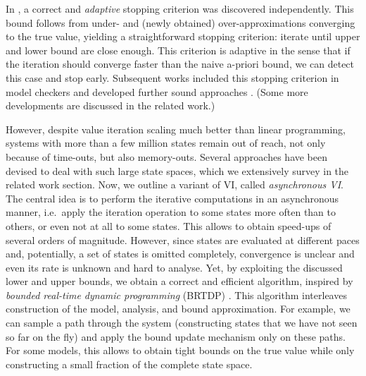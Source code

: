 \documentclass{article}
\begin{document}
In \cite{DBLP:conf/rp/HaddadM14,DBLP:conf/atva/BrazdilCCFKKPU14}, a correct and \emph{adaptive} stopping criterion was discovered independently.
This bound follows from under- and (newly obtained) over-approximations converging to the true value, yielding a straightforward stopping criterion: iterate until upper and lower bound are close enough.
This criterion is adaptive in the sense that if the iteration should converge faster than the naive a-priori bound, we can detect this case and stop early.
Subsequent works included this stopping criterion in model checkers \cite{DBLP:conf/cav/Baier0L0W17} and developed further sound approaches \cite{DBLP:conf/cav/QuatmannK18,DBLP:conf/cav/HartmannsK20}.
(Some more developments are discussed in the related work.)

However, despite value iteration scaling much better than linear programming, systems with more than a few million states remain out of reach, not only because of time-outs, but also memory-outs.
Several approaches have been devised to deal with such large state spaces, which we extensively survey in the related work section.
Now, we outline a variant of VI, called \emph{asynchronous VI}.
The central idea is to perform the iterative computations in an asynchronous manner, i.e.\ apply the iteration operation to some states more often than to others, or even not at all to some states.
This allows to obtain speed-ups of several orders of magnitude.
However, since states are evaluated at different paces and, potentially, a set of states is omitted completely, convergence is unclear and even its rate is unknown and hard to analyse.
Yet, by exploiting the discussed lower and upper bounds, we obtain a correct and efficient algorithm, inspired by \emph{bounded real-time dynamic programming} (BRTDP) \cite{DBLP:conf/icml/McMahanLG05}.
This algorithm interleaves construction of the model, analysis, and bound approximation.
For example, we can sample a path through the system (constructing states that we have not seen so far on the fly) and apply the bound update mechanism only on these paths.
For some models, this allows to obtain tight bounds on the true value while only constructing a small fraction of the complete state space.
\end{document}
